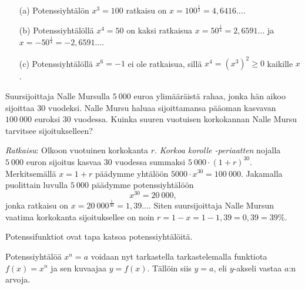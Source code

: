 \begin{esimerkki}
\begin{enumerate}
\item[(a)]
Potenssiyhtälön $x^3 = 100$ ratkaisu on $x=100^{\frac{1}{3}}=4{,}6416...$.
\item[(b)]
Potenssiyhtälöllä $x^4=50$ on kaksi ratkaisua $x=50^{\frac{1}{4}}=2{,}6591...$ ja $x=-50^{\frac{1}{4}}=-2{,}6591...$.
\item[(c)] 
Potenssiyhtälöllä $x^6 = -1$ ei ole ratkaisua, sillä $x^4 = (x^3)^2 \ge 0$ kaikille $x$.
\end{enumerate}
\end{esimerkki}



\begin{esimerkki}
Suursijoittaja Nalle Mursulla $5\ 000$ euroa ylimääräistä rahaa, jonka hän aikoo sijoittaa $30$ vuodeksi.  Nalle Mursu haluaa sijoittamansa pääoman kasvavan $100\ 000$ euroksi $30$ vuodessa.  Kuinka suuren vuotuisen korkokannan Nalle Mursu tarvitsee sijoitukselleen?

\emph{Ratkaisu}:  Olkoon vuotuinen korkokanta $r$. \emph{Korkoa korolle -periaatten} nojalla $5\ 000$ euron sijoitus kasvaa $30$ vuodessa summaksi $5\ 000\cdot(1+r)^{30}$.  Merkitsemällä $x=1+r$ päädymme yhtälöön $5 000\cdot x^{30} = 100\ 000$.  Jakamalla puolittain luvulla $5\ 000$ päädymme potenssiyhtälöön 
$$
x^{30} = 20\ 000,
$$ 
jonka ratkaisu on $x=20\ 000^{\frac{1}{30}} = 1{,}39...$. Siten suursijoittaja Nalle Mursun vaatima korkokanta sijoituksellee on noin $r=1-x=1-1{,}39=0{,}39=39\%.$
\end{esimerkki}

Potenssifunktiot ovat tapa katsoa potenssiyhtälöitä.


Potenssiyhtälöä $x^n=a$ voidaan nyt tarkastella tarkastelemalla funktiota $f(x)=x^n$ ja sen kuvaajaa $y=f(x)$. Tällöin siis $y=a$, eli $y$-akseli vastaa $a$:n arvoja.



